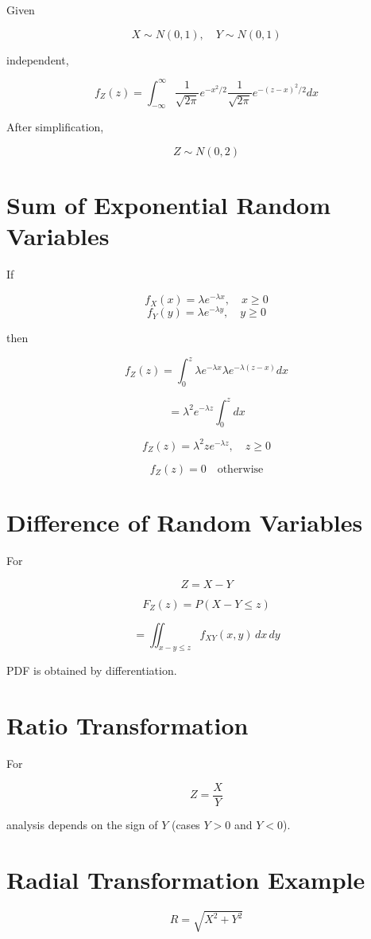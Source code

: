 \documentclass[12pt]{article}
\begin{document}
Given

\[
X \sim N(0,1), \quad Y \sim N(0,1)
\]

independent,

\[
f_Z(z)=\int_{-\infty}^{\infty}
\frac{1}{\sqrt{2\pi}}e^{-x^2/2}
\frac{1}{\sqrt{2\pi}}e^{-(z-x)^2/2}dx
\]

After simplification,

\[
\boxed{Z \sim N(0,2)}
\]

\section{Sum of Exponential Random Variables}

If

\[
f_X(x)=\lambda e^{-\lambda x}, \quad x\ge0
\]
\[
f_Y(y)=\lambda e^{-\lambda y}, \quad y\ge0
\]

then

\[
f_Z(z)=\int_0^z \lambda e^{-\lambda x}\lambda e^{-\lambda(z-x)} dx
\]

\[
= \lambda^2 e^{-\lambda z}\int_0^z dx
\]

\[
\boxed{
f_Z(z)=\lambda^2 z e^{-\lambda z}, \quad z\ge0
}
\]

\[
f_Z(z)=0 \quad \text{otherwise}
\]

\section{Difference of Random Variables}

For

\[
Z = X - Y
\]

\[
F_Z(z)=P(X-Y\le z)
\]

\[
= \iint_{x-y \le z} f_{XY}(x,y)\,dx\,dy
\]

PDF is obtained by differentiation.

\section{Ratio Transformation}

For

\[
Z=\frac{X}{Y}
\]

analysis depends on the sign of $Y$ (cases $Y>0$ and $Y<0$).

\section{Radial Transformation Example}

\[
R=\sqrt{X^2+Y^2}
\]
\end{document}
